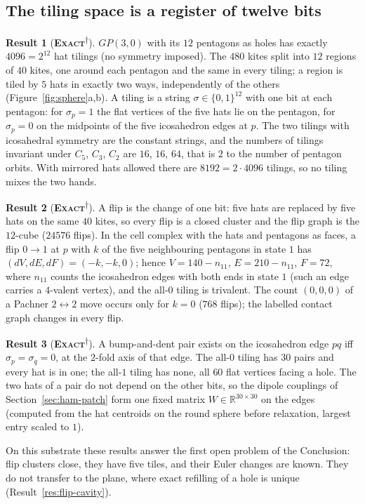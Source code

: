 \documentclass[11pt]{article}
\newcommand{\exact}{\textbf{\textsc{Exact}}}
\newcommand{\snap}{\textsuperscript{$\dagger$}}      %
\theoremstyle{definition}
\newtheorem{result}{Result}
\begin{document}
\subsection{The tiling space is a register of twelve bits}
\begin{result}[\exact\snap]\label{res:sphere-register}
$GP(3,0)$ with its $12$ pentagons as holes has exactly $4096=2^{12}$ hat tilings (no symmetry imposed). The $480$ kites split into $12$ regions of $40$ kites, one around each pentagon and the same in every tiling; a region is tiled by $5$ hats in exactly two ways, independently of the others (Figure~\ref{fig:sphere}a,b). A tiling is a string $\sigma\in\{0,1\}^{12}$ with one bit at each pentagon: for $\sigma_p=1$ the flat vertices of the five hats lie on the pentagon, for $\sigma_p=0$ on the midpoints of the five icosahedron edges at $p$. The two tilings with icosahedral symmetry are the constant strings, and the numbers of tilings invariant under $C_5$, $C_3$, $C_2$ are $16$, $16$, $64$, that is $2$ to the number of pentagon orbits. With mirrored hats allowed there are $8192=2\cdot4096$ tilings, so no tiling mixes the two hands.
\end{result}
\begin{result}[\exact\snap]\label{res:sphere-flips}
A flip is the change of one bit: five hats are replaced by five hats on the same $40$ kites, so every flip is a closed cluster and the flip graph is the $12$-cube ($24576$ flips). In the cell complex with the hats and pentagons as faces, a flip $0\to1$ at $p$ with $k$ of the five neighbouring pentagons in state $1$ has $(dV,dE,dF)=(-k,-k,0)$; hence $V=140-n_{11}$, $E=210-n_{11}$, $F=72$, where $n_{11}$ counts the icosahedron edges with both ends in state $1$ (such an edge carries a $4$-valent vertex), and the all-$0$ tiling is trivalent. The count $(0,0,0)$ of a Pachner $2\leftrightarrow2$ move occurs only for $k=0$ ($768$ flips); the labelled contact graph changes in every flip.
\end{result}
\begin{result}[\exact\snap]\label{res:sphere-pairs}
A bump-and-dent pair exists on the icosahedron edge $pq$ iff $\sigma_p=\sigma_q=0$, at the $2$-fold axis of that edge. The all-$0$ tiling has $30$ pairs and every hat is in one; the all-$1$ tiling has none, all $60$ flat vertices facing a hole. The two hats of a pair do not depend on the other bits, so the dipole couplings of Section~\ref{sec:ham-patch} form one fixed matrix $W\in\mathbb{R}^{30\times30}$ on the edges (computed from the hat centroids on the round sphere before relaxation, largest entry scaled to $1$).
\end{result}
On this substrate these results answer the first open problem of the Conclusion: flip clusters close, they have five tiles, and their Euler changes are known. They do not transfer to the plane, where exact refilling of a hole is unique (Result~\ref{res:flip-cavity}).
\end{document}

